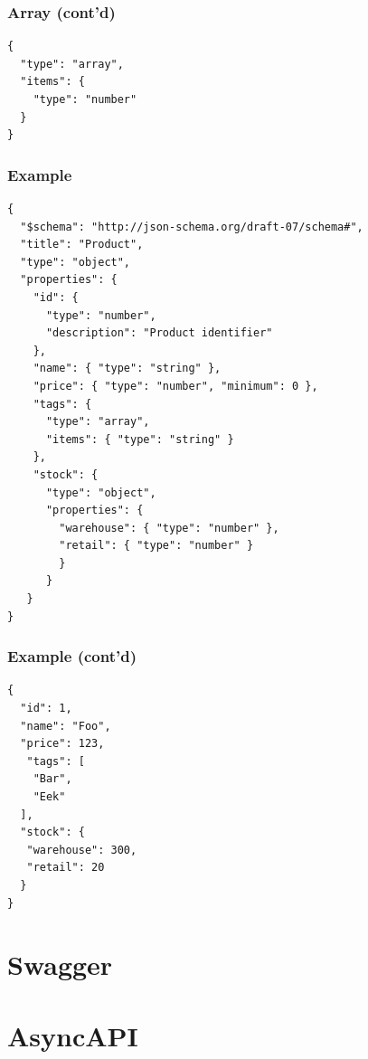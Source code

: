 \documentclass{efd-lecture}
\begin{document}
\begin{frame}[fragile]
  \frametitle{Array (cont'd)}
  \begin{verbatim}
{
  "type": "array",
  "items": {
    "type": "number"
  }
}
  \end{verbatim}
\end{frame}

\begin{frame}[fragile]
  \frametitle{Example}
  \scriptsize
  \begin{verbatim}
{
  "$schema": "http://json-schema.org/draft-07/schema#",
  "title": "Product",
  "type": "object",
  "properties": {
    "id": {
      "type": "number",
      "description": "Product identifier"
    },
    "name": { "type": "string" },
    "price": { "type": "number", "minimum": 0 },
    "tags": {
      "type": "array",
      "items": { "type": "string" }
    },
    "stock": {
      "type": "object",
      "properties": {
        "warehouse": { "type": "number" },
        "retail": { "type": "number" }
        }
      }
   }
}
  \end{verbatim}
\end{frame}

\begin{frame}[fragile]
  \frametitle{Example (cont'd)}
  \begin{verbatim}
{
  "id": 1,
  "name": "Foo",
  "price": 123,
   "tags": [
    "Bar",
    "Eek"
  ],
  "stock": {
   "warehouse": 300,
   "retail": 20
  }
}
  \end{verbatim}
\end{frame}

\section{Swagger}

\section{AsyncAPI}
\end{document}
